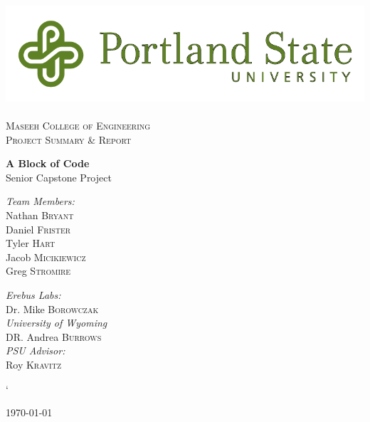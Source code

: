 \documentclass[12pt,a4paper]{article}
\begin{document}
\begin{titlepage}
\begin{center}

\includegraphics[width=.75\textwidth]{./PSU_logo.png}~\\[.5cm]

\textsc{\LARGE \color{PSU} Maseeh College of Engineering}\\[1.5cm]

\textsc{\Large Project Summary \& Report}\\[0.5cm]

\vspace{1cm}

{ \huge \bfseries\color{PSU} A Block of Code\\[0.4cm] }
  \large Senior Capstone Project

\vspace{2.5cm}
 \begin{multicols}{2}

\begin{flushleft}
\noindent
 \large
\emph{\color{PSU}Team Members:}\\
Nathan \textsc{Bryant}\\
Daniel \textsc{Frister}\\
Tyler  \textsc{Hart}\\
Jacob   \textsc{Micikiewicz}\\
Greg    \textsc{Stromire}\\
\end{flushleft}

 \begin{flushleft}
  \large
 \emph{\color{PSU}Erebus Labs:} \\
 Dr. Mike  \textsc{Borowczak}\\
 \emph{\color{PSU}University of Wyoming}\\
 DR. Andrea \textsc{Burrows}\\
 \emph{\color{PSU}PSU Advisor:}\\
 Roy \textsc{Kravitz}
 \end{flushleft}


 \end{multicols}`
\vfill

{\large \today}

\end{center}
\end{titlepage}
 \tableofcontents
 \vfill
\end{document}
